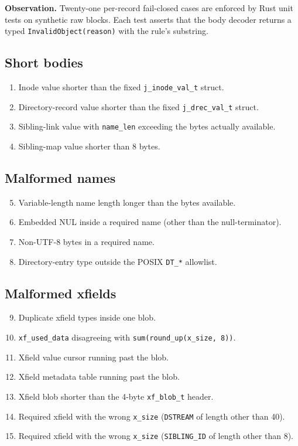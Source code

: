 \textbf{Observation.} Twenty-one per-record fail-closed cases are
enforced by Rust unit tests on synthetic raw blocks. Each test
asserts that the body decoder returns a typed
\texttt{InvalidObject(reason)} with the rule's substring.

\subsection{Short bodies}

\begin{enumerate}
  \item Inode value shorter than the fixed \texttt{j\_inode\_val\_t}
    struct.
  \item Directory-record value shorter than the fixed
    \texttt{j\_drec\_val\_t} struct.
  \item Sibling-link value with \texttt{name\_len} exceeding the bytes
    actually available.
  \item Sibling-map value shorter than 8 bytes.
\end{enumerate}

\subsection{Malformed names}

\begin{enumerate}
  \setcounter{enumi}{4}
  \item Variable-length name length longer than the bytes available.
  \item Embedded NUL inside a required name (other than the
    null-terminator).
  \item Non-UTF-8 bytes in a required name.
  \item Directory-entry type outside the POSIX \texttt{DT\_*}
    allowlist.
\end{enumerate}

\subsection{Malformed xfields}

\begin{enumerate}
  \setcounter{enumi}{8}
  \item Duplicate xfield types inside one blob.
  \item \texttt{xf\_used\_data} disagreeing with
    \texttt{sum(round\_up(x\_size, 8))}.
  \item Xfield value cursor running past the blob.
  \item Xfield metadata table running past the blob.
  \item Xfield blob shorter than the 4-byte \texttt{xf\_blob\_t}
    header.
  \item Required xfield with the wrong \texttt{x\_size}
    (\texttt{DSTREAM} of length other than 40).
  \item Required xfield with the wrong \texttt{x\_size}
    (\texttt{SIBLING\_ID} of length other than 8).
\end{enumerate}

